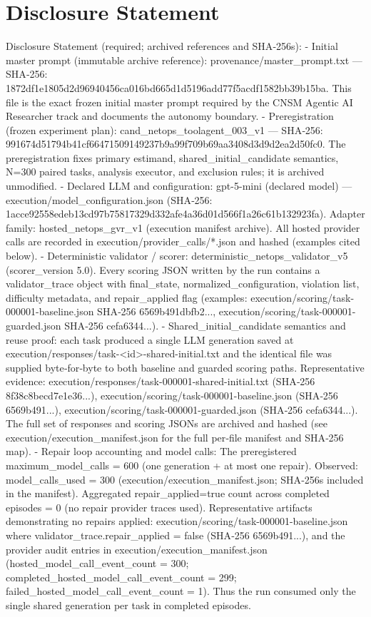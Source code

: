 \documentclass[conference]{IEEEtran}
\begin{document}
\section*{Disclosure Statement}
Disclosure Statement (required; archived references and SHA‑256s):
- Initial master prompt (immutable archive reference): provenance/master\_prompt.txt --- SHA‑256: 1872df1e1805d2d96940456ca016bd665d1d5196add77f5acdf1582bb39b15ba. This file is the exact frozen initial master prompt required by the CNSM Agentic AI Researcher track and documents the autonomy boundary.
- Preregistration (frozen experiment plan): cand\_netops\_toolagent\_003\_v1 --- SHA‑256: 991674d51794b41cf66471509149237b9a99f709b69aa3408d3d9d2ea2d50fc0. The preregistration fixes primary estimand, shared\_initial\_candidate semantics, N=300 paired tasks, analysis executor, and exclusion rules; it is archived unmodified.
- Declared LLM and configuration: gpt-5-mini (declared model) --- execution/model\_configuration.json (SHA‑256: 1acce92558edeb13cd97b75817329d332afe4a36d01d566f1a26c61b132923fa). Adapter family: hosted\_netops\_gvr\_v1 (execution manifest archive). All hosted provider calls are recorded in execution/provider\_calls/*.json and hashed (examples cited below).
- Deterministic validator / scorer: deterministic\_netops\_validator\_v5 (scorer\_version 5.0). Every scoring JSON written by the run contains a validator\_trace object with final\_state, normalized\_configuration, violation list, difficulty metadata, and repair\_applied flag (examples: execution/scoring/task-000001-baseline.json SHA‑256 6569b491dbfb2..., execution/scoring/task-000001-guarded.json SHA‑256 cefa6344...).
- Shared\_initial\_candidate semantics and reuse proof: each task produced a single LLM generation saved at execution/responses/task-<id>-shared-initial.txt and the identical file was supplied byte‑for‑byte to both baseline and guarded scoring paths. Representative evidence: execution/responses/task-000001-shared-initial.txt (SHA‑256 8f38c8becd7e1e36...), execution/scoring/task-000001-baseline.json (SHA‑256 6569b491...), execution/scoring/task-000001-guarded.json (SHA‑256 cefa6344...). The full set of responses and scoring JSONs are archived and hashed (see execution/execution\_manifest.json for the full per‑file manifest and SHA‑256 map).
- Repair loop accounting and model calls: The preregistered maximum\_model\_calls = 600 (one generation + at most one repair). Observed: model\_calls\_used = 300 (execution/execution\_manifest.json; SHA‑256s included in the manifest). Aggregated repair\_applied=true count across completed episodes = 0 (no repair provider traces used). Representative artifacts demonstrating no repairs applied: execution/scoring/task-000001-baseline.json where validator\_trace.repair\_applied = false (SHA‑256 6569b491...), and the provider audit entries in execution/execution\_manifest.json (hosted\_model\_call\_event\_count = 300; completed\_hosted\_model\_call\_event\_count = 299; failed\_hosted\_model\_call\_event\_count = 1). Thus the run consumed only the single shared generation per task in completed episodes.
\end{document}
